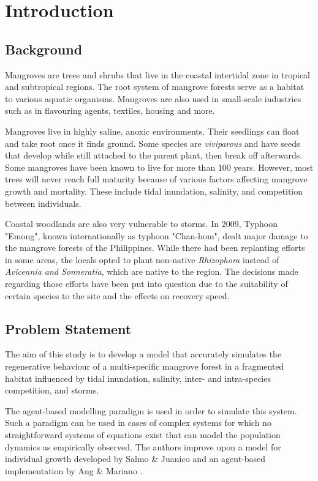 \chapter{Introduction}
\label{cha:intro}

\section{Background}
Mangroves are trees and shrubs that live in the coastal intertidal zone in tropical and subtropical regions. The root system of mangrove forests serve as a habitat to various aquatic organisms. Mangroves are also used in small-scale industries such as in flavouring agents, textiles, housing and more.

Mangroves live in highly saline, anoxic environments. Their seedlings can float and take root once it finds ground. Some species are \emph{viviparous} and have seeds that develop while still attached to the parent plant, then break off afterwards. Some mangroves have been known to live for more than 100 years. However, most trees will never reach full maturity because of various factors affecting mangrove growth and mortality. These include tidal inundation, salinity, and competition between individuals.

Coastal woodlands are also very vulnerable to storms. In 2009, Typhoon "Emong", known internationally as typhoon "Chan-hom", dealt major damage to the mangrove forests of the Philippines. While there had been replanting efforts in some areas, the locals opted to plant non-native \emph{Rhizophora} instead of \emph{Avicennia and Sonneratia}, which are native to the region. The decisions made regarding those efforts have been put into question due to the suitability of certain species to the site and the effects on recovery speed.

\section{Problem Statement}
The aim of this study is to develop a model that accurately simulates the regenerative behaviour of a multi-specific mangrove forest in a fragmented habitat influenced by tidal inundation, salinity, inter- and intra-species competition, and storms.

The agent-based modelling paradigm is used in order to simulate this system. Such a paradigm can be used in cases of complex systems for which no straightforward systems of equations exist that can model the population dynamics as empirically observed. The authors improve upon a model for individual growth developed by Salmo \& Juanico \cite{SalmoJuanico2015} and an agent-based implementation by Ang \& Mariano \cite{mangrovesAngMariano}.

